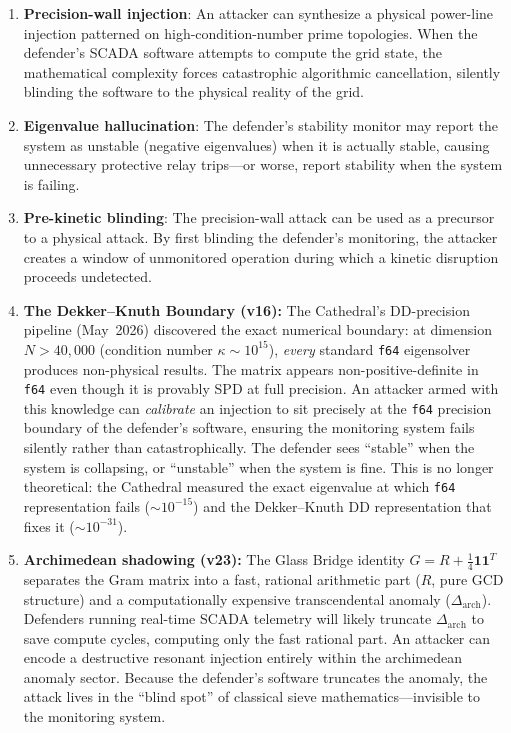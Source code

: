 \documentclass[11pt,a4paper]{article}
\begin{document}
\begin{enumerate}
  \item \textbf{Precision-wall injection}: An attacker can synthesize
    a physical power-line injection patterned on high-condition-number
    prime topologies. When the defender's SCADA software attempts to
    compute the grid state, the mathematical complexity forces
    catastrophic algorithmic cancellation, silently blinding the
    software to the physical reality of the grid.

  \item \textbf{Eigenvalue hallucination}: The defender's stability
    monitor may report the system as unstable (negative eigenvalues)
    when it is actually stable, causing unnecessary protective relay
    trips---or worse, report stability when the system is failing.

  \item \textbf{Pre-kinetic blinding}: The precision-wall attack can
    be used as a precursor to a physical attack. By first blinding
    the defender's monitoring, the attacker creates a window of
    unmonitored operation during which a kinetic disruption proceeds
    undetected.

  \item \textbf{The Dekker--Knuth Boundary (v16):} The Cathedral's
    DD-precision pipeline (May~2026) discovered the exact numerical
    boundary: at dimension $N > 40{,}000$ (condition number
    $\kappa \sim 10^{15}$), \emph{every} standard \texttt{f64}
    eigensolver produces non-physical results. The matrix appears
    non-positive-definite in \texttt{f64} even though it is provably
    SPD at full precision. An attacker armed with this knowledge can
    \emph{calibrate} an injection to sit precisely at the \texttt{f64}
    precision boundary of the defender's software, ensuring the
    monitoring system fails silently rather than catastrophically.
    The defender sees ``stable'' when the system is collapsing,
    or ``unstable'' when the system is fine. This is no longer
    theoretical: the Cathedral measured the exact eigenvalue at
    which \texttt{f64} representation fails ($\sim 10^{-15}$) and the
    Dekker--Knuth DD representation that fixes it ($\sim 10^{-31}$).

  \item \textbf{Archimedean shadowing (v23):} The Glass Bridge
    identity $G = R + \frac{1}{4}\mathbf{1}\mathbf{1}^T$ separates
    the Gram matrix into a fast, rational arithmetic part ($R$,
    pure GCD structure) and a computationally expensive transcendental
    anomaly ($\Delta_{\text{arch}}$). Defenders running real-time
    SCADA telemetry will likely truncate $\Delta_{\text{arch}}$ to
    save compute cycles, computing only the fast rational part.
    An attacker can encode a destructive resonant injection entirely
    within the archimedean anomaly sector. Because the defender's
    software truncates the anomaly, the attack lives in the
    ``blind spot'' of classical sieve mathematics---invisible to
    the monitoring system.
\end{enumerate}
\end{document}
